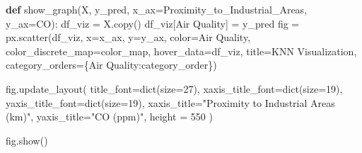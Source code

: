 \documentclass[
  letterpaper,
  DIV=11,
  numbers=noendperiod]{scrartcl}
\newenvironment{Shaded}{\begin{snugshade}}{\end{snugshade}}
\newcommand{\BuiltInTok}[1]{\textcolor[rgb]{0.00,0.23,0.31}{#1}}
\newcommand{\DecValTok}[1]{\textcolor[rgb]{0.68,0.00,0.00}{#1}}
\newcommand{\KeywordTok}[1]{\textcolor[rgb]{0.00,0.23,0.31}{\textbf{#1}}}
\newcommand{\NormalTok}[1]{\textcolor[rgb]{0.00,0.23,0.31}{#1}}
\newcommand{\OperatorTok}[1]{\textcolor[rgb]{0.37,0.37,0.37}{#1}}
\newcommand{\StringTok}[1]{\textcolor[rgb]{0.13,0.47,0.30}{#1}}
\begin{document}
\begin{Shaded}
\begin{Highlighting}[]
\KeywordTok{def}\NormalTok{ show\_graph(X, y\_pred, x\_ax}\OperatorTok{=}\StringTok{\textquotesingle{}Proximity\_to\_Industrial\_Areas\textquotesingle{}}\NormalTok{, y\_ax}\OperatorTok{=}\StringTok{\textquotesingle{}CO\textquotesingle{}}\NormalTok{):}
\NormalTok{    df\_viz }\OperatorTok{=}\NormalTok{ X.copy()}
\NormalTok{    df\_viz[}\StringTok{\textquotesingle{}Air Quality\textquotesingle{}}\NormalTok{] }\OperatorTok{=}\NormalTok{ y\_pred}
\NormalTok{    fig }\OperatorTok{=}\NormalTok{ px.scatter(df\_viz, x}\OperatorTok{=}\NormalTok{x\_ax, y}\OperatorTok{=}\NormalTok{y\_ax, color}\OperatorTok{=}\StringTok{\textquotesingle{}Air Quality\textquotesingle{}}\NormalTok{, color\_discrete\_map}\OperatorTok{=}\NormalTok{color\_map,}
\NormalTok{                     hover\_data}\OperatorTok{=}\NormalTok{df\_viz, title}\OperatorTok{=}\StringTok{\textquotesingle{}KNN Visualization\textquotesingle{}}\NormalTok{,}
\NormalTok{                     category\_orders}\OperatorTok{=}\NormalTok{\{}\StringTok{\textquotesingle{}Air Quality\textquotesingle{}}\NormalTok{:category\_order\})}

\NormalTok{    fig.update\_layout(}
\NormalTok{        title\_font}\OperatorTok{=}\BuiltInTok{dict}\NormalTok{(size}\OperatorTok{=}\DecValTok{27}\NormalTok{), }
\NormalTok{        xaxis\_title\_font}\OperatorTok{=}\BuiltInTok{dict}\NormalTok{(size}\OperatorTok{=}\DecValTok{19}\NormalTok{), }
\NormalTok{        yaxis\_title\_font}\OperatorTok{=}\BuiltInTok{dict}\NormalTok{(size}\OperatorTok{=}\DecValTok{19}\NormalTok{),}
\NormalTok{        xaxis\_title}\OperatorTok{=}\StringTok{"Proximity to Industrial Areas (km)"}\NormalTok{,}
\NormalTok{        yaxis\_title}\OperatorTok{=}\StringTok{"CO (ppm)"}\NormalTok{,}
\NormalTok{        height }\OperatorTok{=} \DecValTok{550}
\NormalTok{    )}
    
\NormalTok{    fig.show()}
\end{Highlighting}
\end{Shaded}
\end{document}
